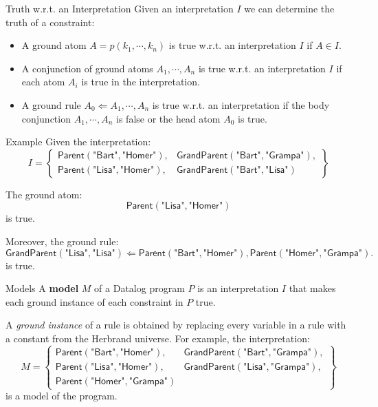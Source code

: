 \begin{frame}{Truth w.r.t. an Interpretation}
Given an interpretation $I$ we can determine the truth of a constraint:
\begin{itemize}
    \item A ground atom $A = p(k_1, \cdots, k_n)$ is true w.r.t. an
    interpretation $I$ if $A \in I$.
    \item A conjunction of ground atoms $A_1, \cdots, A_n$ is true w.r.t. an
    interpretation $I$ if each atom $A_i$ is true in the interpretation.
    \item A ground rule $A_0 \Leftarrow A_1, \cdots, A_n$ is true w.r.t. an
    interpretation if the body conjunction $A_1, \cdots, A_n$ is false or the
    head atom $A_0$ is true.
\end{itemize}
\end{frame}

\begin{frame}{Example}
Given the interpretation:
$$
I = \left\{
\begin{array}{ll}
\textsf{Parent}(\textsf{"Bart"}, \textsf{"Homer"}),      & \textsf{GrandParent}(\textsf{"Bart"}, \textsf{"Grampa"}), \\
\textsf{Parent}(\textsf{"Lisa"}, \textsf{"Homer"}),      & \textsf{GrandParent}(\textsf{"Bart"}, \textsf{"Lisa"})
\end{array}\right\}
$$

\pause

The ground atom:
$$
\textsf{Parent}(\textsf{"Lisa"}, \textsf{"Homer"})
$$
is true.

\pause

Moreover, the ground rule:
$$
\textsf{GrandParent}(\textsf{"Lisa"}, \textsf{"Lisa"}) \Leftarrow \textsf{Parent}(\textsf{"Bart"}, \textsf{"Homer"}), \textsf{Parent}(\textsf{"Homer"}, \textsf{"Grampa"}).
$$
is true.
\end{frame}

\begin{frame}{Models}
A \textbf{model} $M$ of a Datalog program $P$ is an interpretation $I$ that
makes each ground instance of each constraint in $P$ true.

\pause

A \emph{ground instance} of a rule is obtained by replacing every variable in a
rule with a constant from the Herbrand universe. For example, the
interpretation:
$$
M = \left\{
\begin{array}{ll}
\textsf{Parent}(\textsf{"Bart"}, \textsf{"Homer"}),     & \textsf{GrandParent}(\textsf{"Bart"}, \textsf{"Grampa"}), \\
\textsf{Parent}(\textsf{"Lisa"}, \textsf{"Homer"}),     & \textsf{GrandParent}(\textsf{"Lisa"}, \textsf{"Grampa"}), \\
\textsf{Parent}(\textsf{"Homer"}, \textsf{"Grampa"})
\end{array}\right\}
$$
is a model of the program.
\end{frame}

